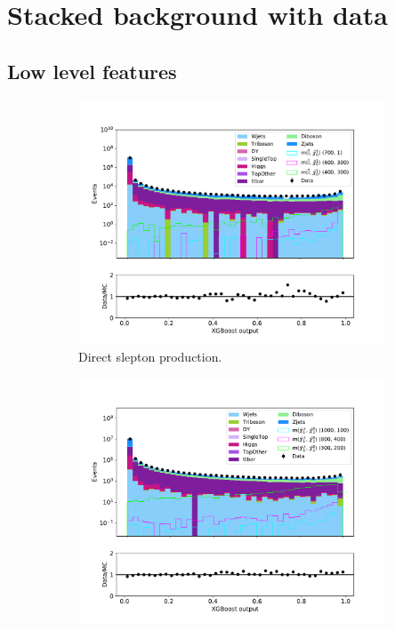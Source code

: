 \section{Stacked background with data}
\subsection{Low level features}

\begin{figure}[H]
    \centering
    \begin{subfigure}[t!]{0.49\textwidth}
        \includegraphics[width = \textwidth]{Figures/Stacked/stackedplot_BDT_Low_level_slepslep.pdf}
        \caption{Direct slepton production.}
        \label{fig:}
    \end{subfigure}
    \begin{subfigure}[t!]{0.49\textwidth}
        \includegraphics[width = \textwidth]{Figures/Stacked/stackedplot_BDT_Low_level_slepsnu.pdf}

\end{subfigure}
\end{figure}
